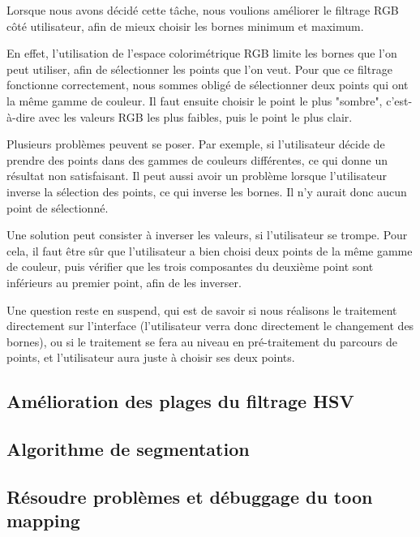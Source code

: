 \documentclass[12pt,titlepage,french]{article}
\begin{document}
Lorsque nous avons décidé cette tâche, nous voulions améliorer le filtrage RGB côté utilisateur, afin de mieux choisir les bornes minimum et maximum. \newline

En effet, l'utilisation de l'espace colorimétrique RGB limite les bornes que l'on peut utiliser, afin de sélectionner les points que l'on veut. Pour que ce filtrage fonctionne correctement, nous sommes obligé de sélectionner deux points qui ont la même gamme de couleur. Il faut ensuite choisir le point le plus "sombre", c'est-à-dire avec les valeurs RGB les plus faibles, puis le point le plus clair. \newline

Plusieurs problèmes peuvent se poser. Par exemple, si l'utilisateur décide de prendre des points dans des gammes de couleurs différentes, ce qui donne un résultat non satisfaisant. Il peut aussi avoir un problème lorsque l'utilisateur inverse la sélection des points, ce qui inverse les bornes. Il n'y aurait donc aucun point de sélectionné. \newline

Une solution peut consister à inverser les valeurs, si l'utilisateur se trompe. Pour cela, il faut être sûr que l'utilisateur a bien choisi deux points de la même gamme de couleur, puis vérifier que les trois composantes du deuxième point sont inférieurs au premier point, afin de les inverser. \newline

Une question reste en suspend, qui est de savoir si nous réalisons le traitement directement sur l'interface (l'utilisateur verra donc directement le changement des bornes), ou si le traitement se fera au niveau en pré-traitement du parcours de points, et l'utilisateur aura juste à choisir ses deux points.

\subsection{Amélioration des plages du filtrage HSV}



\subsection{Algorithme de segmentation}

\subsection{Résoudre problèmes et débuggage du toon mapping}
\end{document}
